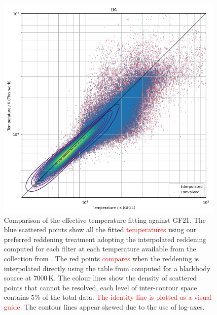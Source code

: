 \documentclass[fleqn,usenatbib]{rasti}
\begin{document}
\begin{figure}
    \centering
    \includegraphics[width=\columnwidth]{fig_03_compare_fusillo_edr3.png}
    \caption{Comparison of the effective temperature fitting against GF21. The blue scattered points show all the fitted \textcolor{red}{temperatures} using our preferred reddening treatment adopting the interpolated reddening computed for each filter at each temperature available from the collection from \citet{2010MmSAI..81..921K}. The red points \textcolor{red}{compares} when the reddening is interpolated directly using the table from \citet{2011ApJ...737..103S} computed for a blackbody source at $7000$\,K. The colour lines show the density of scattered points that cannot be resolved, each level of inter-contour space contains $5\%$ of the total data. \textcolor{red}{The identity line is plotted as a visual guide.} The contour lines appear skewed due to the use of log-axes.}
    \label{fig:comparison}
\end{figure}
\end{document}
